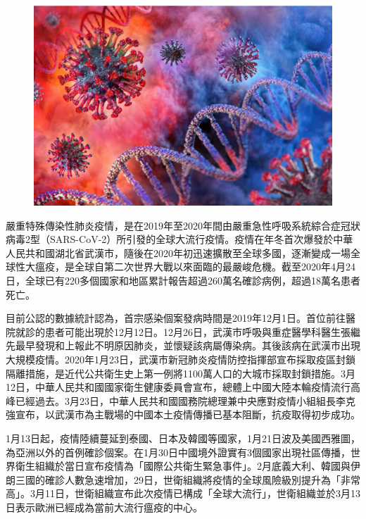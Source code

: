 \documentclass[12pt, a4paper]{report}
\begin{document}
\begin{figure}[H] %
    \centering %
    \includegraphics[width=1\textwidth]{background.jpg} %
\end{figure}

嚴重特殊傳染性肺炎疫情，是在2019年至2020年間由嚴重急性呼吸系統綜合症冠狀病毒2型（SARS-CoV-2）所引發的全球大流行疫情。疫情在年冬首次爆發於中華人民共和國湖北省武漢市，隨後在2020年初迅速擴散至全球多國，逐漸變成一場全球性大瘟疫，是全球自第二次世界大戰以來面臨的最嚴峻危機。截至2020年4月24日，全球已有220多個國家和地區累計報告超過260萬名確診病例，超過18萬名患者死亡。

目前公認的數據統計認為，首宗感染個案發病時間是2019年12月1日。首位前往醫院就診的患者可能出現於12月12日。12月26日，武漢市呼吸與重症醫學科醫生張繼先最早發現和上報此不明原因肺炎，並懷疑該病屬傳染病。其後該病在武漢市出現大規模疫情。2020年1月23日，武漢市新冠肺炎疫情防控指揮部宣布採取疫區封鎖隔離措施，是近代公共衛生史上第一例將1100萬人口的大城市採取封鎖措施。3月12日，中華人民共和國國家衛生健康委員會宣布，總體上中國大陸本輪疫情流行高峰已經過去。3月23日，中華人民共和國國務院總理兼中央應對疫情小組組長李克強宣布，以武漢市為主戰場的中國本土疫情傳播已基本阻斷，抗疫取得初步成功。

1月13日起，疫情陸續蔓延到泰國、日本及韓國等國家，1月21日波及美國西雅圖，為亞洲以外的首例確診個案。在1月30日中國境外證實有3個國家出現社區傳播，世界衛生組織於當日宣布疫情為「國際公共衛生緊急事件」。2月底義大利、韓國與伊朗三國的確診人數急速增加，29日，世衛組織將疫情的全球風險級別提升為「非常高」。3月11日，世衛組織宣布此次疫情已構成「全球大流行」，世衛組織並於3月13日表示歐洲已經成為當前大流行瘟疫的中心。
\end{document}
